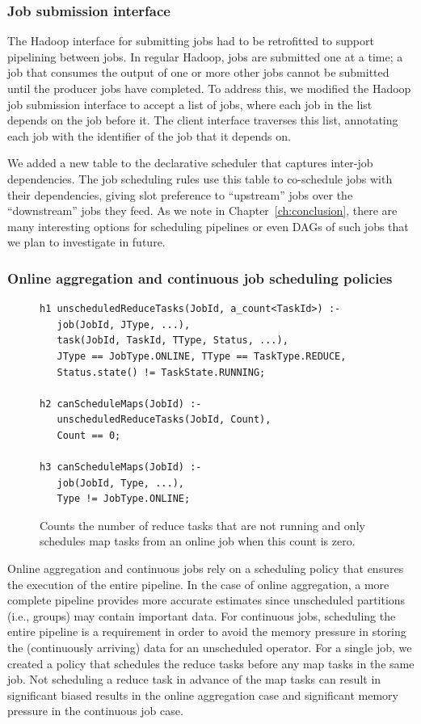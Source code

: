\subsubsection{Job submission interface}

The Hadoop {\JT} interface for submitting jobs had to be retrofitted to support
pipelining between jobs.  In regular Hadoop, jobs are submitted one at a time;
a job that consumes the output of one or more other jobs cannot be submitted
until the producer jobs have completed.  To address this, we modified the
Hadoop job submission interface to accept a list of jobs, where each job in the
list depends on the job before it.  The client interface traverses this list,
annotating each job with the identifier of the job that it depends on.

We added a new table to the declarative scheduler that captures inter-job
dependencies.  The job scheduling rules use this table to co-schedule jobs with
their dependencies, giving slot preference to ``upstream'' jobs over the
``downstream'' jobs they feed.  As we note in Chapter~\ref{ch:conclusion},
there are many interesting options for scheduling pipelines or even DAGs of
such jobs that we plan to investigate in future.


\subsubsection{Online aggregation and continuous job scheduling policies}

\begin{figure}
\ssp
\centering
\begin{lstlisting}
h1 unscheduledReduceTasks(JobId, a_count<TaskId>) :-
   job(JobId, JType, ...),
   task(JobId, TaskId, TType, Status, ...),
   JType == JobType.ONLINE, TType == TaskType.REDUCE,
   Status.state() != TaskState.RUNNING;

h2 canScheduleMaps(JobId) :-
   unscheduledReduceTasks(JobId, Count),
   Count == 0;

h3 canScheduleMaps(JobId) :-
   job(JobId, Type, ...),
   Type != JobType.ONLINE;
\end{lstlisting}
\caption{\label{ch:hop:fig:schedmaps} Counts the number of reduce tasks that are not running and 
only schedules map tasks from an online job when this count is zero.}
\end{figure}


Online aggregation and continuous jobs rely on a scheduling policy that ensures
the execution of the entire pipeline.  In the case of online aggregation, a
more complete pipeline provides more accurate estimates since unscheduled
partitions (i.e., groups) may contain important data.  For continuous jobs,
scheduling the entire pipeline is a requirement in order to avoid the memory
pressure in storing the (continuously arriving) data for an unscheduled
operator.  For a single job, we created a policy that schedules the reduce
tasks before any map tasks in the same job.  Not scheduling a reduce task in
advance of the map tasks can result in significant biased results in the online
aggregation case and significant memory pressure in the continuous job case.

